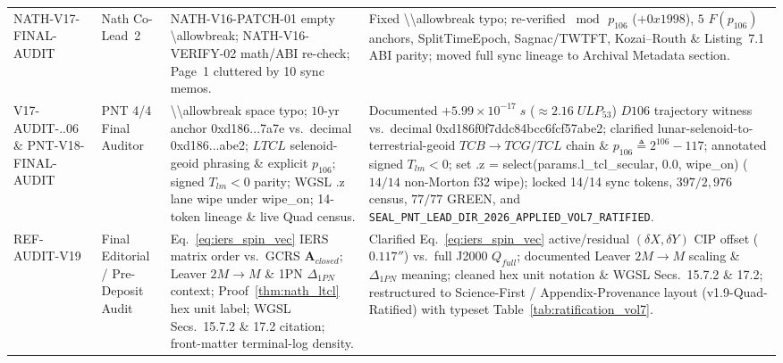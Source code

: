 \documentclass[11pt,a4paper,reqno]{article}
\def\texttt#1{#1}%
\def\mathrm#1{#1}%
\def\mathcal#1{#1}%
\def\mathbb#1{#1}%
\def\F#1{F(#1)}%
\def\Done{D106}%
\def\LTCL{LTCL}%
\theoremstyle{plain}
\theoremstyle{definition}
\theoremstyle{remark}
\numberwithin{equation}{section}
\numberwithin{table}{section}
\newcommand{\F}[1]{\mathbb{F}_{#1}}
\newcommand{\Done}{\mathbb{D}_{106}}
\newcommand{\LTCL}{L_{\mathrm{TCL}}}
\begin{document}
\begin{longtable}{@{} P{2.65cm} P{2.45cm} P{4.10cm} P{\dimexpr\textwidth-9.2cm-6\tabcolsep\relax} @{}}
\texttt{NATH-\allowbreak V17-\allowbreak FINAL-\allowbreak AUDIT} & Nath Co-Lead~2 & \texttt{NATH-V16-PATCH-01} empty \texttt{\textbackslash allowbreak}; \texttt{NATH-V16-VERIFY-02} math/ABI re-check; Page~1 cluttered by 10 sync memos. & Fixed \texttt{\textbackslash\textbackslash allowbreak} typo; re-verified $\bmod\,p_{106}$ ($+\texttt{0x1998}$), $5$ $\F{p_{106}}$ anchors, \texttt{SplitTimeEpoch}, Sagnac/TWTFT, Kozai--Routh \& Listing~7.1 ABI parity; moved full sync lineage to Archival Metadata section. \\
\texttt{V17-\allowbreak AUDIT-..06} \& \texttt{PNT-V18-\allowbreak FINAL-AUDIT} & PNT 4/4 Final Auditor & \texttt{\textbackslash\textbackslash allowbreak} space typo; $10$-yr anchor \texttt{0xd186...7a7e} vs.\ decimal \texttt{0xd186...abe2}; $\LTCL$ selenoid-geoid phrasing \& explicit $p_{106}$; signed $\mathcal{T}_{lm}<0$ parity; WGSL \texttt{.z} lane wipe under \texttt{wipe\_on}; 14-token lineage \& live Quad census. & Documented $+5.99\times 10^{-17}\;\mathrm{s}$ ($\approx 2.16\;\mathrm{ULP}_{53}$) $\Done$ trajectory witness vs.\ decimal \texttt{0xd186\allowbreak f0f7\allowbreak ddc84bcc\allowbreak 6fcf57abe2}; clarified lunar-selenoid-to-terrestrial-geoid $\mathrm{TCB}\to\mathrm{TCG}/\mathrm{TCL}$ chain \& $p_{106}\triangleq 2^{106}-117$; annotated signed $\mathcal{T}_{lm}<0$; set \texttt{.z = select(params.l\_tcl\_secular, 0.0, wipe\_on)} ($14/14$ non-Morton \texttt{f32} wipe); locked 14/14 sync tokens, $397/2{,}976$ census, $77/77$ GREEN, and \nolinkurl{SEAL_PNT_LEAD_DIR_2026_APPLIED_VOL7_RATIFIED}. \\
\texttt{REF-AUDIT-V19} & Final Editorial / Pre-Deposit Audit & Eq.~\eqref{eq:iers_spin_vec} IERS matrix order vs.\ GCRS $\mathbf{A}_{\mathrm{closed}}$; Leaver $2M\to M$ \& 1PN $\Delta_{1\mathrm{PN}}$ context; Proof~\ref{thm:nath_ltcl} hex unit label; WGSL Secs.~15.7.2 \& 17.2 citation; front-matter terminal-log density. & Clarified Eq.~\eqref{eq:iers_spin_vec} active/residual $(\delta X,\delta Y)$ CIP offset ($0.117''$) vs.\ full J2000 $Q_{\mathrm{full}}$; documented Leaver $2M\to M$ scaling \& $\Delta_{1\mathrm{PN}}$ meaning; cleaned hex unit notation \& WGSL Secs.~15.7.2 \& 17.2; restructured to Science-First / Appendix-Provenance layout (\texttt{v1.9-Quad-Ratified}) with typeset Table~\ref{tab:ratification_vol7}. \\

\end{longtable}
\end{document}
